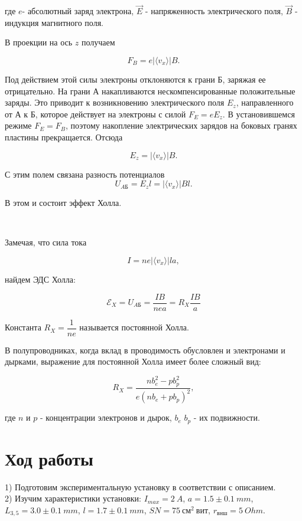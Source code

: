 \documentclass[a4paper, 12pt]{article}%
\begin{document}
	где $e$- абсолютный заряд электрона, $\vec{E}$ - напряженность электрического поля, $\vec{B}$ - индукция магнитного поля.
	
	В проекции на ось $z$ получаем
	
	$$ F_{B}=e | \langle {v_{x}} \rangle | B.$$
	
	Под действием этой силы электроны отклоняются к грани Б, заряжая ее отрицательно. На грани А накапливаются нескомпенсированные положительные заряды. Это приводит к возникновению электрического поля $E_{z}$, направленного от А к Б, которое действует на электроны с силой $F_{E}=eE_{z}$. В установившемся режиме $F_{E}=F_{B}$, поэтому накопление электрических зарядов на боковых гранях пластины прекращается. Отсюда
	
	$$ E_{z}=| \langle {v_{x}} \rangle | B.$$
	
	С этим полем связана разность потенциалов $$U_{AБ}=E_{z}l=| \langle {v_{x}} \rangle | Bl.$$
	
	В этом и состоит эффект Холла.
	
	\
	
	Замечая, что сила тока
	
	$$ I=ne| \langle {v_{x}} \rangle |la,$$
	
	найдем ЭДС Холла:
	
	\begin{equation}\label{Rx}
		\mathscr{E}_{X}=U_{AБ}=\dfrac{IB}{nea}=R_{X}\dfrac{IB}{a}
	\end{equation}
	
	Константа $R_{X}=\dfrac{1}{ne}$ называется постоянной Холла.
	
	В полупроводниках, когда вклад в проводимость обусловлен и электронами и дырками, выражение для постоянной Холла имеет более сложный вид:
	
	$$R_{X}=\dfrac{nb^{2}_{e}-pb^{2}_{p}}{e(nb_{e}+pb_{p})^{2}},$$
	
	где $n$ и $p$ - концентрации электронов и дырок, $b_{e}$ $b_{p}$ - их подвижности.
	\section{Ход работы}
	1) Подготовим экспериментальную установку в соответствии с описанием.\\
	2) Изучим характеристики установки: $I_{max} = 2~A$, $a = 1.5\pm0.1~mm$, $L_{3, 5} = 3.0\pm0.1~mm$, $l=1.7\pm0.1~mm$, $SN=75~см^2~вит$, $r_{внш}=5~Ohm$.\\
\end{document}
